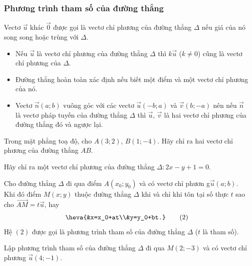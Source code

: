 \subsubsection{Phương trình tham số của đường thẳng}
\begin{dn}
	Vectơ $\vec{u}$ khác $\vec{0}$ được gọi là vectơ chỉ phương  của đường thẳng $\Delta$ nếu giá của nó song song hoặc trùng  với $\Delta$.
\end{dn}
\begin{nx}
	\begin{itemize}
		\item Nếu $\vec{u}$ là vectơ chỉ phương  của đường thẳng $\Delta$ thì $k\vec{u}$ ($k \ne 0$) cũng là vectơ chỉ phương của $\Delta$.
		\item Đường thẳng hoàn toàn xác định nếu biết một điểm và một vectơ chỉ phương của nó.
		\item Vectơ $\vec{n}(a;b)$ vuông góc với các vectơ $\vec{u}(-b;a)$ và $\vec{v}(b;-a)$ nên nếu $\vec{n}$ là vectơ pháp tuyến của đường thẳng $\Delta$ thì $\vec{u}$, $\vec{v}$ là hai vectơ chỉ phương của đường thẳng đó và ngược lại.
	\end{itemize}
\end{nx}

\begin{vd}
	Trong mặt phẳng toạ độ, cho  $A(3;2)$, $B(1;-4)$. Hãy chỉ ra  hai  vectơ chỉ phương  của đường  thẳng $AB$.
\end{vd}

\begin{vd}
	Hãy chỉ ra một vectơ  chỉ phương  của đường thẳng $\Delta \colon 2x-y+1=0$.
\end{vd}
\begin{dn}
	Cho đường thẳng $\Delta$ đi qua điểm $A(x_0;y_0)$ và có vectơ chỉ phươn g$\vec{u}(a;b)$. Khi đó điểm $M(x;y)$  thuộc  đường thẳng $\Delta$ khi và chỉ khi tôn tại số thực $t$ sao cho $\vec{AM}=t\vec{u}$, hay 
	\[\heva{&x=x_0+at\\&y=y_0+bt.} \quad \quad (2)\]
	Hệ $(2)$ được gọi là phương trình tham số của đường thẳng $\Delta$ ($t$ là tham số).
\end{dn}

\begin{vd}
	Lập phương trình tham số của đường thẳng $\Delta$ đi qua $M(2;-3)$ và có  vectơ  chỉ phương $\vec{u}(4;-1)$.
\end{vd}

